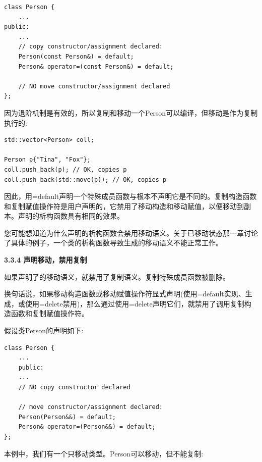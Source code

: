 \begin{lstlisting}[caption={}]
class Person {
	...
public:
	...
	// copy constructor/assignment declared:
	Person(const Person&) = default;
	Person& operator=(const Person&) = default;
	
	// NO move constructor/assignment declared
};
\end{lstlisting}

因为退阶机制是有效的，所以复制和移动一个Person可以编译，但移动是作为复制执行的:\par

\begin{lstlisting}[caption={}]
std::vector<Person> coll;

Person p{"Tina", "Fox"};
coll.push_back(p); // OK, copies p
coll.push_back(std::move(p)); // OK, copies p
\end{lstlisting}

因此，用=default声明一个特殊成员函数与根本不声明它是不同的。复制构造函数和复制赋值操作符是用户声明的，它禁用了移动构造和移动赋值，以便移动到副本。声明的析构函数具有相同的效果。\par

您可能想知道为什么声明的析构函数会禁用移动语义。关于已移动状态那一章讨论了具体的例子，一个类的析构函数导致生成的移动语义不能正常工作。\par

\hspace*{\fill} \par %
\textbf{3.3.4 声明移动，禁用复制}

如果声明了的移动语义，就禁用了复制语义。复制特殊成员函数被删除。\par

换句话说，如果移动构造函数或移动赋值操作符显式声明(使用=default实现、生成，或使用=delete禁用)，那么通过使用=delete声明它们，就禁用了调用复制构造函数和复制赋值操作符。\par

假设类Person的声明如下:\par

\begin{lstlisting}[caption={}]
class Person {
	...
	public:
	...
	// NO copy constructor declared
	
	// move constructor/assignment declared:
	Person(Person&&) = default;
	Person& operator=(Person&&) = default;
};
\end{lstlisting}

本例中，我们有一个只移动类型。Person可以移动，但不能复制:\par


